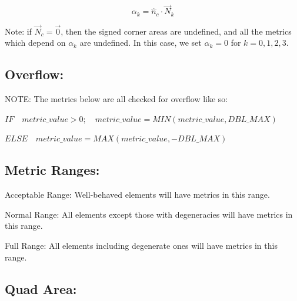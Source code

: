 \documentclass[12pt]{article}
\begin{document}
\begin{displaymath}
\alpha_k = \hat n_c \cdot \vec N_k 
\end{displaymath}

\noindent Note: if $\vec N_c = \vec 0$, then the signed corner areas are undefined, \newline
and all the metrics which depend on $\alpha_k$ are undefined. \newline
In this case, we set $\alpha_k = 0$ for $k=0,1,2,3$.

\subsection*{Overflow:}

\begin{flushleft}
NOTE:  The metrics below are all checked for overflow like so:
\end{flushleft}

\begin{flushleft}
${IF \quad metric\_value > 0;  \quad metric\_value = MIN( metric\_value, DBL\_MAX )}$
\end{flushleft}
 
\begin{flushleft}
${ELSE \quad metric\_value = MAX( metric\_value, -DBL\_MAX )}$
\end{flushleft}

\subsection*{Metric Ranges:}

\begin{flushleft}
Acceptable Range: Well-behaved elements will have metrics in this range.
\end{flushleft}
\begin{flushleft}
Normal Range:     All elements except those with degeneracies will have  \newline
                  metrics in this range.
\end{flushleft}
\begin{flushleft}
Full Range:       All elements including degenerate ones will have metrics \newline
                  in this range. 
\end{flushleft}


\subsection*{Quad Area:}
\end{document}
